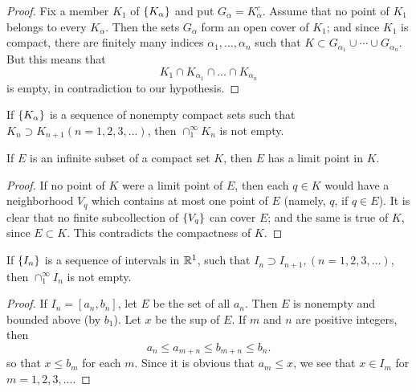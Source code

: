 \begin{proof}
    Fix a member $K_1$ of $\protect\{K_\alpha\}$ and put $G_\alpha = K^c_\alpha$.
    Assume that no point of $K_1$ belongs to every $K_\alpha$.
    Then the sets $G_\alpha$ form an open cover of $K_1$;
    and since $K_1$ is compact, there are finitely many indices $\alpha_1, ..., \alpha_n$ such that $K \subset G_{\alpha_1} \cup \cdots \cup G_{\alpha_n}$.
    But this means that
    \begin{equation*}
        K_1 \cap
        K_{\alpha_1} \cap
        \dots \cap
        K_{\alpha_n}
    \end{equation*}
    is empty, in contradiction to our hypothesis.
\end{proof}

\begin{myCorollary*}
    If $\protect\{K_\alpha\}$ is a sequence of nonempty compact sets such that $K_n \supset K_{n+1} (n=1,2,3,...)$, then $\cap_1^\infty K_n$ is not empty.
\end{myCorollary*}

\begin{thm}
    \label{thm:2.37}
    If $E$ is an infinite subset of a compact set $K$,
    then $E$ has a limit point in $K$.
\end{thm}

\begin{proof}
    If no point of $K$ were a limit point of $E$,
    then each $q \in K$ would have a neighborhood $V_q$ which contains at most one point of $E$ (namely, $q$, if $q \in E$).
    It is clear that no finite subcollection of $\protect\{V_q\}$ can cover $E$;
    and the same is true of $K$, since $E \subset K$. This contradicts the compactness of $K$.
\end{proof}

\begin{thm}
    \label{thm:2.38}
    If $\protect\{I_n\}$ is a sequence of intervals in ${\protect\mathbb R}^1$,
    such that $I_n \supset I_{n+1}, (n=1,2,3,...)$,
    then $\cap_1^\infty I_n$ is not empty.
\end{thm}

\begin{proof}
    If $I_n = [a_n, b_n]$, let $E$ be the set of all $a_n$.
    Then $E$ is nonempty and bounded above (by $b_1$).
    Let $x$ be the sup of $E$.
    If $m$ and $n$ are positive integers, then
    \begin{equation*}
        a_{n} \leq
        a_{m+n} \leq
        b_{m+n} \leq
        b_{n} .
    \end{equation*}
    so that $x \leq b_m$ for each $m$.
    Since it is obvious that $a_m \leq x$,
    we see that $x \in I_m$ for $m = 1, 2, 3, ...$.
\end{proof}

